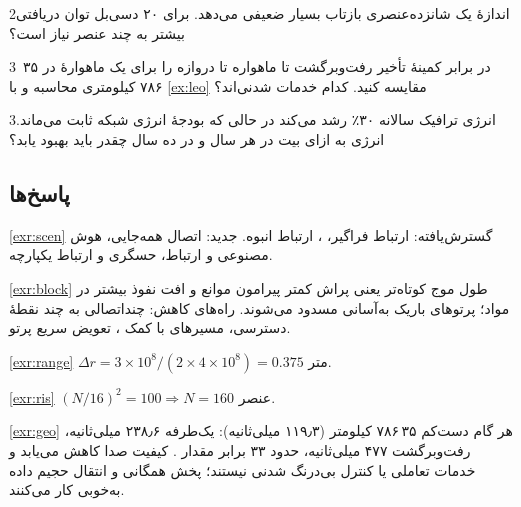 \documentclass[11pt,a4paper]{article}
\begin{document}
\begin{exercisebox}{2}{اندازهٔ }\label{exr:ris}
یک  شانزده‌عنصری بازتاب بسیار ضعیفی می‌دهد. برای ۲۰ دسی‌بل توان دریافتی بیشتر به چند عنصر نیاز است؟
\end{exercisebox}

\begin{exercisebox}{3}{ در برابر }\label{exr:geo}
کمینهٔ تأخیر رفت‌وبرگشت  تا ماهواره تا دروازه را برای یک ماهوارهٔ  در ۳۵\,۷۸۶ کیلومتری محاسبه و با \cref{ex:leo} مقایسه کنید. کدام خدمات شدنی‌اند؟
\end{exercisebox}

\begin{exercisebox}{3}{انرژی}\label{exr:energy}
ترافیک سالانه ۳۰٪ رشد می‌کند در حالی که بودجهٔ انرژی شبکه ثابت می‌ماند. انرژی به ازای بیت در هر سال و در ده سال چقدر باید بهبود یابد؟
\end{exercisebox}

\subsection*{پاسخ‌ها}

\begin{solutionbox}{\ref{exr:scen}}
گسترش‌یافته: ارتباط فراگیر، ، ارتباط انبوه. جدید: اتصال همه‌جایی، هوش مصنوعی و ارتباط، حسگری و ارتباط یکپارچه.
\end{solutionbox}

\begin{solutionbox}{\ref{exr:block}}
طول موج کوتاه‌تر یعنی پراش کمتر پیرامون موانع و افت نفوذ بیشتر در مواد؛ پرتوهای باریک به‌آسانی مسدود می‌شوند. راه‌های کاهش: چنداتصالی به چند نقطهٔ
دسترسی، مسیرهای با کمک ، تعویض سریع پرتو.
\end{solutionbox}

\begin{solutionbox}{\ref{exr:range}}
$\Delta r = 3\times10^{8}/(2\times4\times10^{8}) = 0.375$ متر.
\end{solutionbox}

\begin{solutionbox}{\ref{exr:ris}}
$(N/16)^2 = 100 \Rightarrow N = 160$ عنصر.
\end{solutionbox}

\begin{solutionbox}{\ref{exr:geo}}
هر گام دست‌کم ۳۵\,۷۸۶ کیلومتر (۱۱۹٫۳ میلی‌ثانیه): یک‌طرفه ۲۳۸٫۶ میلی‌ثانیه، رفت‌وبرگشت ۴۷۷ میلی‌ثانیه، حدود ۳۳ برابر مقدار . کیفیت صدا کاهش
می‌یابد و خدمات تعاملی یا کنترل بی‌درنگ شدنی نیستند؛ پخش همگانی و انتقال حجیم داده به‌خوبی کار می‌کنند.
\end{solutionbox}
\end{document}
